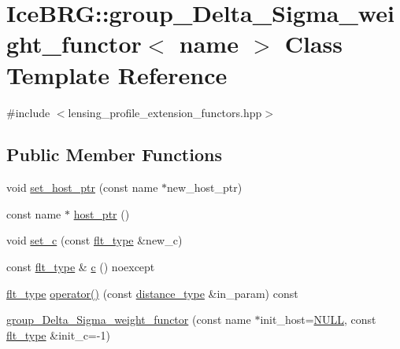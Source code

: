 \hypertarget{classIceBRG_1_1group__Delta__Sigma__weight__functor}{}\section{Ice\+B\+R\+G\+:\+:group\+\_\+\+Delta\+\_\+\+Sigma\+\_\+weight\+\_\+functor$<$ name $>$ Class Template Reference}
\label{classIceBRG_1_1group__Delta__Sigma__weight__functor}


{\ttfamily \#include $<$lensing\+\_\+profile\+\_\+extension\+\_\+functors.\+hpp$>$}

\subsection*{Public Member Functions}
\begin{DoxyCompactItemize}
\item 
void \hyperlink{classIceBRG_1_1group__Delta__Sigma__weight__functor_a7604f13fcc78df74617c382c5fb5c5d6}{set\+\_\+host\+\_\+ptr} (const name $\ast$new\+\_\+host\+\_\+ptr)
\item 
const name $\ast$ \hyperlink{classIceBRG_1_1group__Delta__Sigma__weight__functor_a743ad713470220e5ef291fb3a51f1665}{host\+\_\+ptr} ()
\item 
void \hyperlink{classIceBRG_1_1group__Delta__Sigma__weight__functor_aeb4f683bdc69e22b52df8c393815cc5c}{set\+\_\+c} (const \hyperlink{lib_2IceBRG__main_2common_8h_ad0f130a56eeb944d9ef2692ee881ecc4}{flt\+\_\+type} \&new\+\_\+c)
\item 
const \hyperlink{lib_2IceBRG__main_2common_8h_ad0f130a56eeb944d9ef2692ee881ecc4}{flt\+\_\+type} \& \hyperlink{classIceBRG_1_1group__Delta__Sigma__weight__functor_a895307cc8ca91afe783e4003cd31f158}{c} () noexcept
\item 
\hyperlink{lib_2IceBRG__main_2common_8h_ad0f130a56eeb944d9ef2692ee881ecc4}{flt\+\_\+type} \hyperlink{classIceBRG_1_1group__Delta__Sigma__weight__functor_acfd67130c53a190b42addf42be6ad48a}{operator()} (const \hyperlink{namespaceIceBRG_a45499647eb87e24c10ab32c628711cec}{distance\+\_\+type} \&in\+\_\+param) const 
\item 
\hyperlink{classIceBRG_1_1group__Delta__Sigma__weight__functor_ad13731848c1217c780caa3b7e6320e0e}{group\+\_\+\+Delta\+\_\+\+Sigma\+\_\+weight\+\_\+functor} (const name $\ast$init\+\_\+host=\hyperlink{lib_2IceBRG__main_2common_8h_a070d2ce7b6bb7e5c05602aa8c308d0c4}{N\+U\+L\+L}, const \hyperlink{lib_2IceBRG__main_2common_8h_ad0f130a56eeb944d9ef2692ee881ecc4}{flt\+\_\+type} \&init\+\_\+c=-\/1)
\end{DoxyCompactItemize}


